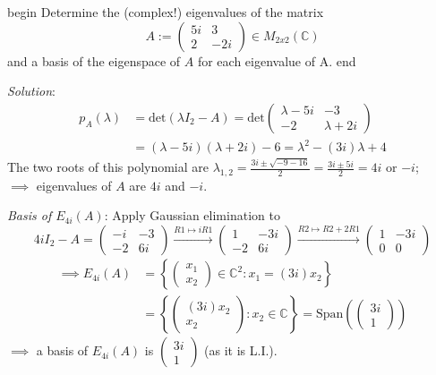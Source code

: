 \documentclass[
  12pt,
  a4paper,
  twoside]{article}
\theoremstyle{plain}
\theoremstyle{definition}
\begin{document}
\csname begin\label{cnj:expl-eigen1}
Determine the (complex!) eigenvalues of the matrix
\[A:= \begin{pmatrix} 5i & 3 \\ 2 & -2i \end{pmatrix} \in M_{2x2} (\mathbb{C}) \]
and a basis of the eigenspace of \(A\) for each eigenvalue of A.
\csname end

\emph{Solution}:
\begin{align*}
p_{A}(\lambda) &= \mathrm{det}(\lambda I_{2} - A) = \mathrm{det} \begin{pmatrix} \lambda - 5i & -3 \\ -2 & \lambda + 2i \end{pmatrix}\\
&= (\lambda - 5i)(\lambda + 2i) - 6 = \lambda^{2} -(3i)\lambda + 4
\end{align*}
The two roots of this polynomial are \(\lambda_{1,2} = \frac{3i \pm \sqrt{-9 -16}}{2} =\frac{3i \pm 5i}{2} = 4i\) or \(-i\);\\
\(\implies\) eigenvalues of \(A\) are \(4i\) and \(-i\).

\emph{Basis of \(E_{4i}(A)\)}:
Apply Gaussian elimination to
\[
4i I_{2} - A = \begin{pmatrix} -i & -3 \\ -2 & 6i \end{pmatrix} \xrightarrow{R1 \mapsto iR1}
\begin{pmatrix} 1 & -3i \\ -2 & 6i \end{pmatrix} \xrightarrow{R2 \mapsto R2 + 2R1} \begin{pmatrix} 1 & -3i \\ 0 & 0 \end{pmatrix}
\]
\begin{align*}\implies E_{4i}(A) &= \left\{ \begin{pmatrix} x_{1} \\ x_{2} \end{pmatrix} \in \mathbb{C}^{2} : x_{1} = (3i)x_{2} \right\} \\
&= \left\{ \begin{pmatrix} (3i)x_{2} \\ x_{2} \end{pmatrix} : x_{2} \in \mathbb{C} \right\} = \mathrm{Span} \left(\begin{pmatrix} 3i \\ 1 \end{pmatrix} \right)
\end{align*}
\(\implies\) a basis of \(E_{4i}(A)\) is \(\begin{pmatrix} 3i \\ 1 \end{pmatrix}\) (as it is L.I.).
\end{document}
